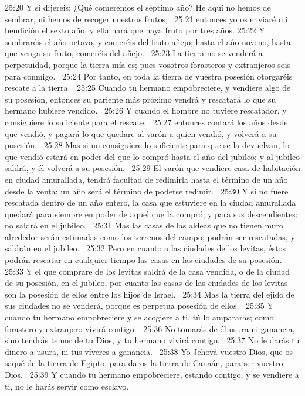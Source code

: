 25:20 Y si dijereis: ¿Qué comeremos el séptimo año? He aquí no hemos de sembrar, ni hemos de recoger nuestros frutos;  
25:21 entonces yo os enviaré mi bendición el sexto año, y ella hará que haya fruto por tres años. 
25:22 Y sembraréis el año octavo, y comeréis del fruto añejo; hasta el año noveno, hasta que venga su fruto, comeréis del añejo.  
25:23 La tierra no se venderá a perpetuidad, porque la tierra mía es; pues vosotros forasteros y extranjeros sois para conmigo.  
25:24 Por tanto, en toda la tierra de vuestra posesión otorgaréis rescate a la tierra.  
25:25 Cuando tu hermano empobreciere, y vendiere algo de su posesión, entonces su pariente más próximo vendrá y rescatará lo que su hermano hubiere vendido.  
25:26 Y cuando el hombre no tuviere rescatador, y consiguiere lo suficiente para el rescate,  
25:27 entonces contará los años desde que vendió, y pagará lo que quedare al varón a quien vendió, y volverá a su posesión.  
25:28 Mas si no consiguiere lo suficiente para que se la devuelvan, lo que vendió estará en poder del que lo compró hasta el año del jubileo; y al jubileo saldrá, y él volverá a su posesión.  
25:29 El varón que vendiere casa de habitación en ciudad amurallada, tendrá facultad de redimirla hasta el término de un año desde la venta; un año será el término de poderse redimir.  
25:30 Y si no fuere rescatada dentro de un año entero, la casa que estuviere en la ciudad amurallada quedará para siempre en poder de aquel que la compró, y para sus descendientes; no saldrá en el jubileo.  
25:31 Mas las casas de las aldeas que no tienen muro alrededor serán estimadas como los terrenos del campo; podrán ser rescatadas, y saldrán en el jubileo.  
25:32 Pero en cuanto a las ciudades de los levitas, éstos podrán rescatar en cualquier tiempo las casas en las ciudades de su posesión.  
25:33 Y el que comprare de los levitas saldrá de la casa vendida, o de la ciudad de su posesión, en el jubileo, por cuanto las casas de las ciudades de los levitas son la posesión de ellos entre los hijos de Israel.  
25:34 Mas la tierra del ejido de sus ciudades no se venderá, porque es perpetua posesión de ellos.  
25:35 Y cuando tu hermano empobreciere y se acogiere a ti, tú lo ampararás; como forastero y extranjero vivirá contigo.  
25:36 No tomarás de él usura ni ganancia, sino tendrás temor de tu Dios, y tu hermano vivirá contigo.  
25:37 No le darás tu dinero a usura, ni tus víveres a ganancia.  
25:38 Yo Jehová vuestro Dios, que os saqué de la tierra de Egipto, para daros la tierra de Canaán, para ser vuestro Dios.  
25:39 Y cuando tu hermano empobreciere, estando contigo, y se vendiere a ti, no le harás servir como esclavo.  
